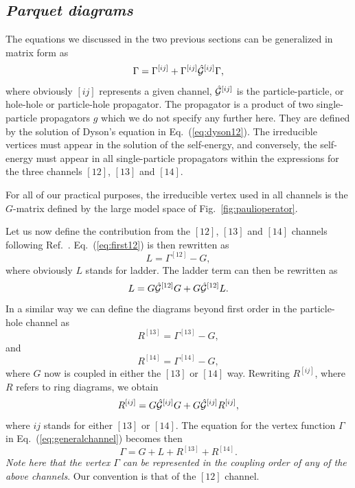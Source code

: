 \documentclass{article}
\begin{document}
\subsection{\it Parquet diagrams}

The equations we discussed in the two previous sections can
be generalized
in matrix form as
\begin{equation}
      \Gamma= \Gamma^{[ij]}+\Gamma^{[ij]}\hat{{\cal G}}^{[ij]}\Gamma,
      \label{eq:generalchannel}
\end{equation}
where obviously $[ij]$ represents a given channel,
$\hat{{\cal G}}^{[ij]}$ is the particle-particle, or hole-hole or particle-hole
propagator.
The propagator is a product of two single-particle propagators $g$
which we do not specify any further here. They are
defined by the solution of Dyson's equation in Eq.\ (\ref{eq:dyson12}).
The irreducible vertices must appear in the solution of
the self-energy, and conversely, the self-energy must appear in all
single-particle propagators within the expressions for the three
channels $[12]$, $[13]$ and $[14]$.

For all of our practical purposes, the irreducible vertex used in all
channels is the $G$-matrix defined by the large model space of 
Fig.~\ref{fig:paulioperator}. 

Let us now define the contribution from the $[12]$, $[13]$ and
$[14]$ channels following Ref.\ \cite{jls82}.
Eq.\ (\ref{eq:first12}) is then rewritten as
\begin{equation}
    L=\Gamma^{[12]}-G,
\end{equation}
where obviously $L$ stands for ladder.
The ladder term can then be rewritten as
\begin{equation}
    L=G\hat{{\cal G}}^{[12]}G+G\hat{{\cal G}}^{[12]}L.
    \label{eq:ladder}
\end{equation}
In a similar way we can define the diagrams beyond
first order in the particle-hole channel as
\begin{equation}
    R^{[13]}=\Gamma^{[13]}-G,
\end{equation}
and
\begin{equation}
    R^{[14]}=\Gamma^{[14]}-G,
\end{equation}
where $G$ now is coupled in either the $[13]$ or $[14]$ way.
Rewriting $R^{[ij]}$, where $R$ refers to ring diagrams,
we obtain
\begin{equation}
    R^{[ij]}=G\hat{{\cal G}}^{[ij]}G+G\hat{{\cal G}}^{[ij]}R^{[ij]},
    \label{eq:ring}
\end{equation}
where $ij$ stands for either $[13]$ or $[14]$.
The equation for the vertex function $\Gamma$ in Eq.\
(\ref{eq:generalchannel}) becomes then
\begin{equation}
    \Gamma=G+L+R^{[13]}+R^{[14]}.
     \label{eq:gammap}
\end{equation}
{\em Note here that the vertex $\Gamma$ can be represented in the coupling
order of any of the above channels}. Our convention is that of the
$[12]$ channel.
\end{document}

